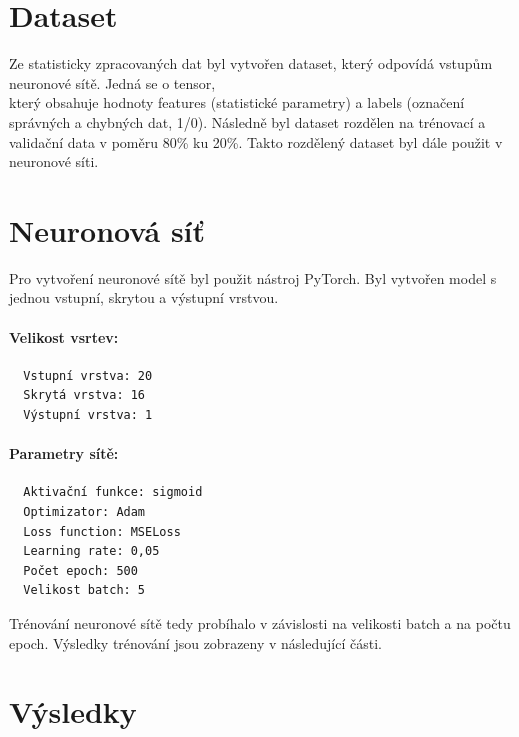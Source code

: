 \documentclass[11pt]{article}
\begin{document}
\hypertarget{dataset}{%
\section{Dataset}\label{dataset}}

Ze statisticky zpracovaných dat byl vytvořen dataset, který odpovídá
vstupům neuronové sítě. Jedná se o tensor,\\
který obsahuje hodnoty features (statistické parametry) a labels
(označení správných a chybných dat, 1/0). Následně byl dataset rozdělen
na trénovací a validační data v poměru 80\% ku 20\%. Takto rozdělený
dataset byl dále použit v neuronové síti.

\hypertarget{neuronovuxe1-suxedux165}{%
\section{Neuronová síť}\label{neuronovuxe1-suxedux165}}

Pro vytvoření neuronové sítě byl použit nástroj PyTorch. Byl vytvořen
model s jednou vstupní, skrytou a výstupní vrstvou.

\hypertarget{velikost-vsrtev}{%
\paragraph{Velikost vsrtev:}\label{velikost-vsrtev}}

\begin{verbatim}
  Vstupní vrstva: 20
  Skrytá vrstva: 16
  Výstupní vrstva: 1
\end{verbatim}

\hypertarget{parametry-suxedtux11b}{%
\paragraph{Parametry sítě:}\label{parametry-suxedtux11b}}

\begin{verbatim}
  Aktivační funkce: sigmoid
  Optimizator: Adam 
  Loss function: MSELoss 
  Learning rate: 0,05 
  Počet epoch: 500 
  Velikost batch: 5
\end{verbatim}

Trénování neuronové sítě tedy probíhalo v závislosti na velikosti batch
a na počtu epoch. Výsledky trénování jsou zobrazeny v následující části.

\hypertarget{vuxfdsledky}{%
\section{Výsledky}\label{vuxfdsledky}}
\end{document}
